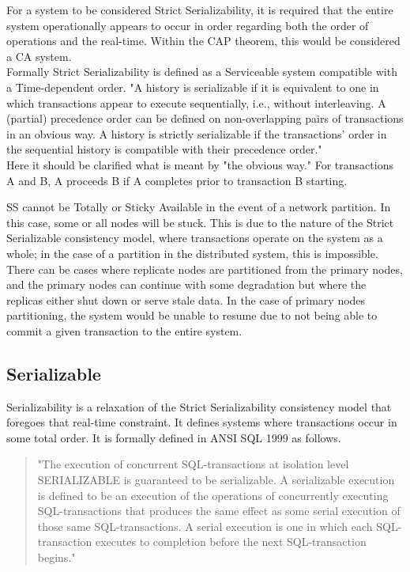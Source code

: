 \documentclass[a4paper,10pt,titlepage]{report}
\begin{document}
For a system to be considered Strict Serializability, it is required that the entire system operationally appears to occur in order regarding both the order of operations and the real-time. Within the CAP theorem, this would be considered a CA system.\\
\vspace{5mm}
Formally Strict Serializability is defined as a Serviceable system compatible with a Time-dependent order.
"A history is serializable if it is equivalent to one in which transactions appear to execute sequentially, i.e., without interleaving. A (partial) precedence order can be defined on non-overlapping pairs of transactions in an obvious way. A history is strictly serializable if the transactions' order in the sequential history is compatible with their precedence order."  \cite{Herlihy1990Linearizability}\\
\vspace{5mm}
Here it should be clarified what is meant by "the obvious way." For transactions A and B, A proceeds B if A completes prior to transaction B starting.

SS cannot be Totally or Sticky Available in the event of a network partition. In this case, some or all nodes will be stuck. This is due to the nature of the Strict Serializable consistency model, where transactions operate on the system as a whole; in the case of a partition in the distributed system, this is impossible. There can be cases where replicate nodes are partitioned from the primary nodes, and the primary nodes can continue with some degradation but where the replicas either shut down or serve stale data. In the case of primary nodes partitioning, the system would be unable to resume due to not being able to commit a given transaction to the entire system.\\
\vspace{2mm}




\subsection{Serializable}

Serializability is a relaxation of the Strict Serializability consistency model that foregoes that real-time constraint. It defines systems where transactions occur in some total order. It is formally defined in ANSI SQL 1999 \cite{ansisql1999} as follows.

\begin{quote}
"The execution of concurrent SQL-transactions at isolation level SERIALIZABLE is guaranteed to be serializable. A serializable execution is defined to be an execution of the operations of concurrently executing SQL-transactions that produces the same effect as some serial execution of those same SQL-transactions. A serial execution is one in which each SQL-transaction executes to completion before the next SQL-transaction begins." \cite{ansisql1999}\\
\end{quote}
\vspace{5mm}
\end{document}
